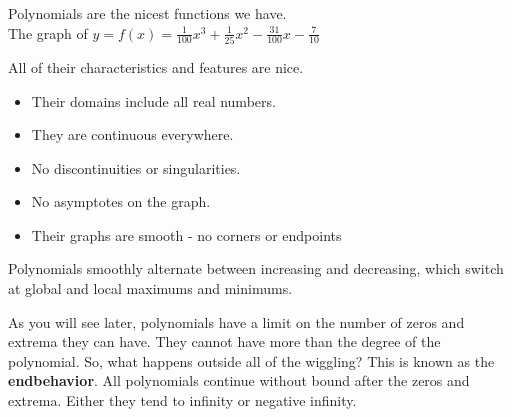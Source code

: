 \documentclass{ximera}
\begin{document}
Polynomials are the nicest functions we have. \\

The graph of $y = f(x) = \frac{1}{100} x^3 + \frac{1}{25} x^2 - \frac{31}{100} x - \frac{7}{10}$

\begin{image}
\end{image}



All of their characteristics and features are nice.

\begin{itemize}
\item Their domains include all real numbers. 
\item They are continuous everywhere.
\item No discontinuities or singularities.
\item No asymptotes on the graph.
\item Their graphs are smooth - no corners or endpoints
\end{itemize}


Polynomials smoothly alternate between increasing and decreasing, which switch at global and local maximums and minimums.

As you will see later, polynomials have a limit on the number of zeros and extrema they can have.  They cannot have more than the degree of the polynomial. So, what happens outside all of the wiggling?  This is known as the \textbf{endbehavior}.  All polynomials continue without bound after the zeros and extrema.  Either they tend to infinity or negative infinity.
\end{document}
